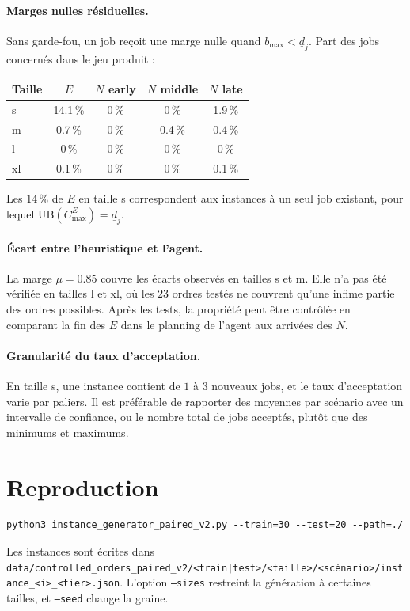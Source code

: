 \documentclass[11pt,a4paper]{article}
\newcommand{\UB}{\mathrm{UB}}
\begin{document}
\paragraph{Marges nulles résiduelles.}
Sans garde-fou, un job reçoit une marge nulle quand $b_{\max} < \underline{d}_j$. Part des jobs concernés dans le jeu produit :
\begin{center}
\begin{tabular}{lcccc}
\toprule
Taille & $E$ & $N$ early & $N$ middle & $N$ late \\
\midrule
s  & 14.1\,\% & 0\,\% & 0\,\%   & 1.9\,\% \\
m  & 0.7\,\%  & 0\,\% & 0.4\,\% & 0.4\,\% \\
l  & 0\,\%    & 0\,\% & 0\,\%   & 0\,\% \\
xl & 0.1\,\%  & 0\,\% & 0\,\%   & 0.1\,\% \\
\bottomrule
\end{tabular}
\end{center}
Les $14\,\%$ de $E$ en taille s correspondent aux instances à un seul job existant, pour lequel $\UB(C^E_{\max}) = \underline{d}_j$.

\paragraph{Écart entre l'heuristique et l'agent.}
La marge $\mu = 0.85$ couvre les écarts observés en tailles s et m.
Elle n'a pas été vérifiée en tailles l et xl, où les $23$ ordres testés ne couvrent qu'une infime partie des ordres possibles.
Après les tests, la propriété peut être contrôlée en comparant la fin des $E$ dans le planning de l'agent aux arrivées des $N$.

\paragraph{Granularité du taux d'acceptation.}
En taille s, une instance contient de $1$ à $3$ nouveaux jobs, et le taux d'acceptation varie par paliers.
Il est préférable de rapporter des moyennes par scénario avec un intervalle de confiance, ou le nombre total de jobs acceptés, plutôt que des minimums et maximums.

\section{Reproduction}

\begin{verbatim}
python3 instance_generator_paired_v2.py --train=30 --test=20 --path=./
\end{verbatim}
Les instances sont écrites dans
\texttt{data/controlled\_orders\_paired\_v2/<train|test>/<taille>/<scénario>/instance\_<i>\_<tier>.json}.
L'option \texttt{--sizes} restreint la génération à certaines tailles, et \texttt{--seed} change la graine.
\end{document}
